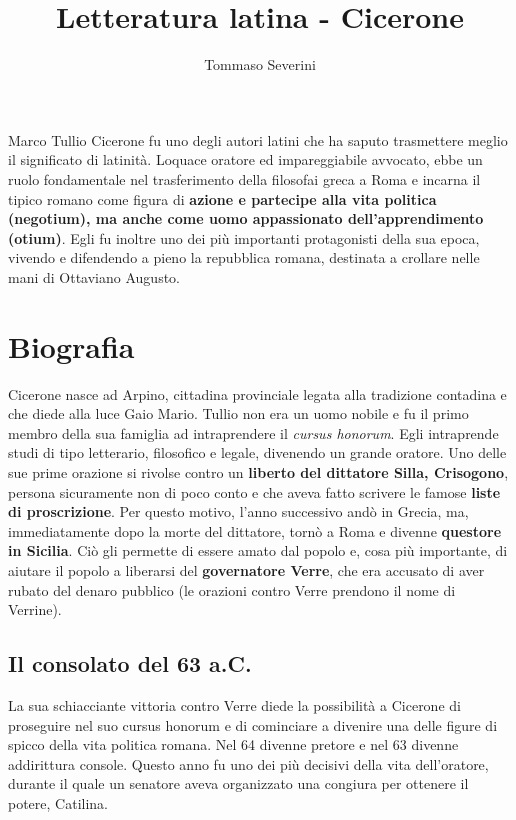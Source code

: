 \documentclass[10pt,a4paper]{article}
\author{Tommaso Severini}
\title{Letteratura latina - Cicerone}
\begin{document}
	\maketitle

 Marco Tullio Cicerone fu uno degli autori latini che ha saputo trasmettere meglio il significato di latinità. Loquace oratore ed impareggiabile avvocato, ebbe un ruolo fondamentale nel trasferimento della filosofai greca a Roma e incarna il tipico romano come figura di \textbf{azione e partecipe alla vita politica (negotium), ma anche come uomo appassionato dell'apprendimento (otium)}. Egli fu inoltre uno dei più importanti protagonisti della sua epoca, vivendo e difendendo a pieno la repubblica romana, destinata a crollare nelle mani di Ottaviano Augusto. 

\section*{Biografia}

Cicerone nasce ad Arpino, cittadina provinciale legata alla tradizione contadina e che diede alla luce Gaio Mario. Tullio non era un uomo nobile e fu il primo membro della sua famiglia ad intraprendere il \textit{cursus honorum}. Egli intraprende studi di tipo letterario, filosofico e legale, divenendo un grande oratore. Uno delle sue prime orazione si rivolse contro un \textbf{liberto del dittatore Silla, Crisogono}, persona sicuramente non di poco conto e che aveva fatto scrivere le famose \textbf{liste di proscrizione}. Per questo motivo, l'anno successivo andò in Grecia, ma, immediatamente dopo la morte del dittatore, tornò a Roma e divenne \textbf{questore in Sicilia}. Ciò gli permette di essere amato dal popolo e, cosa più importante, di aiutare il popolo a liberarsi del \textbf{governatore Verre}, che era accusato di aver rubato del denaro pubblico (le orazioni contro Verre prendono il nome di Verrine). 

\subsection*{Il consolato del 63 a.C.}

La sua schiacciante vittoria contro Verre diede la possibilità a Cicerone di proseguire nel suo cursus honorum e di cominciare a divenire una delle figure di spicco della vita politica romana. Nel 64 divenne pretore e nel 63 divenne addirittura console. Questo anno fu uno dei più decisivi della vita dell'oratore, durante il quale un senatore aveva organizzato una congiura per ottenere il potere, Catilina.\\
\end{document}
